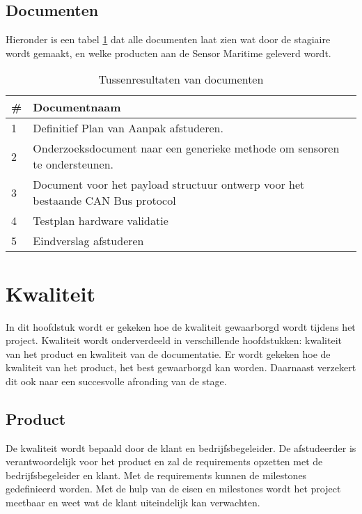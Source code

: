 \subsection{Documenten}
Hieronder is een tabel \ref{tab:documents} dat alle documenten laat zien wat door de stagiaire wordt gemaakt, en welke producten aan de Sensor Maritime geleverd wordt.
\begin{table}[h!] 
	\caption{Tussenresultaten van documenten}
	\begin{tabular}{p{1cm}p{14cm}}
	\toprule
	\textbf{\#} & \textbf{Documentnaam}   \\ \midrule
	1 & Definitief Plan van Aanpak afstuderen. \\
	2 & Onderzoeksdocument naar een generieke methode om sensoren te ondersteunen. \\
	3 & Document voor het payload structuur ontwerp voor het bestaande CAN Bus protocol \\
	4 & Testplan hardware validatie \\
	5 & Eindverslag afstuderen \\ \bottomrule
	\end{tabular}

\label{tab:documents}
\end{table}

\newpage
\section{Kwaliteit}
In dit hoofdstuk wordt er gekeken hoe de kwaliteit gewaarborgd wordt tijdens het project. Kwaliteit wordt onderverdeeld in verschillende hoofdstukken: kwaliteit van het product en kwaliteit van de documentatie. Er wordt gekeken hoe de kwaliteit van het product, het best gewaarborgd kan worden. Daarnaast verzekert dit ook naar een succesvolle afronding van de stage.

\subsection{Product}
De kwaliteit wordt bepaald door de klant en bedrijfsbegeleider. De afstudeerder is verantwoordelijk voor het product en zal de requirements opzetten met de bedrijfsbegeleider en klant. Met de requirements kunnen de milestones gedefinieerd worden. Met de hulp van de eisen en milestones wordt het project meetbaar en weet wat de klant uiteindelijk kan verwachten. \newline

